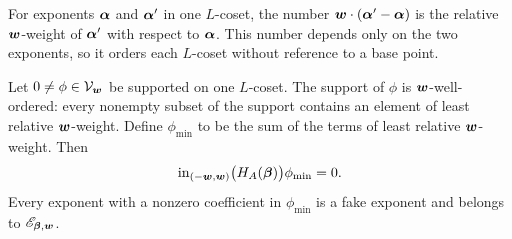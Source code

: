 For exponents \(\boldsymbol{\alpha}\) and \(\boldsymbol{\alpha}'\) in one \(L\)-coset, the number \(\boldsymbol{w}\cdot(\boldsymbol{\alpha}'-\boldsymbol{\alpha})\) is the relative \(\boldsymbol{w}\)-weight of \(\boldsymbol{\alpha}'\) with respect to \(\boldsymbol{\alpha}\).
This number depends only on the two exponents, so it orders each \(L\)-coset without reference to a base point.

\begin{lemma}
	\label{lem:least-term}
	Let \(0\ne\phi\in\mathcal V_{\boldsymbol{w}}\) be supported on one \(L\)-coset.
	The support of \(\phi\) is \(\boldsymbol{w}\)-well-ordered: every nonempty subset of the support contains an element of least relative \(\boldsymbol{w}\)-weight.
	Define \(\phi_{\min}\) to be the sum of the terms of least relative \(\boldsymbol{w}\)-weight.
	Then
	\begin{equation}
		\operatorname{in}_{(-\boldsymbol{w},\boldsymbol{w})}\bigl(H_A(\boldsymbol{\beta})\bigr)\phi_{\min}=0.
		\label{eq:least-term-initial-system}
	\end{equation}
	Every exponent with a nonzero coefficient in \(\phi_{\min}\) is a fake exponent and belongs to \(\mathscr E_{\boldsymbol{\beta},\boldsymbol{w}}\).
\end{lemma}

